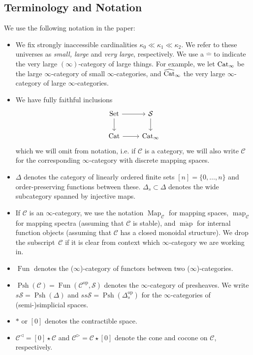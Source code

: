 \documentclass[10pt]{amsart}
\numberwithin{equation}{section}
\theoremstyle{definition}
\DeclareMathOperator{\Map}{Map}
\DeclareMathOperator{\map}{map}
\DeclareMathOperator{\Fun}{Fun}
\DeclareMathOperator{\Set}{Set}
\DeclareMathOperator{\op}{op}
\DeclareMathOperator{\Psh}{Psh}
\newcommand{\Cat}{\mathrm{Cat}\vphantom{t}}
\newcommand{\CatHat}{\widehat{\mathrm{Cat}}\vphantom{t}}
\newcommand{\Simp}{\mathbb{\Delta}}
\newcommand{\cC}{\mathcal{C}}
\newcommand{\cS}{\mathcal{S}}
\newcommand{\join}{\star}
\begin{document}
\subsection*{Terminology and Notation}\label{subsec:terminology_and_notation}
We use the following notation in the paper:
\begin{itemize}
	\item We fix strongly inaccessible cardinalities $\kappa_{0} \ll \kappa_{1} \ll \kappa_{2}$.
  We refer to these universes as \emph{small, large} and \emph{very large}, respectively.
  We use a $\widehat{-}$ to indicate the very large $(\infty)$-category of large things.
  For example, we let $\Cat_{\infty}$ be the large $\infty$-category of small $\infty$-categories, and $\CatHat_{\infty}$ the very large $\infty$-category of large $\infty$-categories.
	\item We have fully faithful inclusions
	\begin{equation*}
		\begin{tikzcd}
			\Set \arrow[r] \arrow[d]      &   \cS  \arrow[d] \\
			\Cat  \arrow[r]               &   \Cat_{\infty}
		\end{tikzcd}
	\end{equation*}
	which we will omit from notation, i.e. if $\cC$ is a category, we will also write $\cC$ for the corresponding $\infty$-category with discrete mapping spaces.
	\item $\Simp$ denotes the category of linearly ordered finite sets $[n] = \{0, \dots , n\}$ and order-preserving functions between these. $\Simp_{s}\subset \Simp$ denotes the wide subcategory spanned by injective maps.
	\item If $\cC$ is an $\infty$-category, we use the notation $\Map_{\cC}$ for mapping spaces, $\map_{\cC}$ for mapping spectra (assuming that $\cC$ is stable), and $\overline{\map}$ for internal function objects (assuming that $\cC$ has a closed monoidal structure).
  We drop the subscript~$\cC$ if it is clear from context which $\infty$-category we are working in.
	\item $\Fun$ denotes the ($\infty$)-category of functors between two ($\infty$)-categories.
	\item $\Psh(\cC)= \Fun(\cC^{\op},\cS)$ denotes the $\infty$-category of presheaves.
  We write $s\cS=\Psh(\Simp)$ and $ss\cS = \Psh(\Simp^{\op}_{s})$ for the $\infty$-categories of (semi-)simplicial spaces.
	\item $\ast$ or $[0]$ denotes the contractible space.
	\item $\cC^{\triangleleft}= [0] \join \cC$ and $\cC^{\triangleright}= \cC \join [0]$ denote the cone and cocone on $\cC$, respectively.

\end{itemize}
\end{document}
